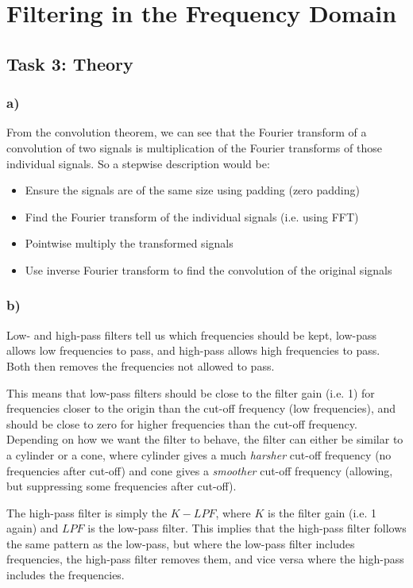 \section{Filtering in the Frequency Domain}
\subsection{Task 3: Theory}
\subsubsection*{a)}
From the convolution theorem, we can see that the Fourier transform of a convolution of two signals is multiplication of the Fourier transforms of those individual signals. So a stepwise description would be: 
\begin{itemize}
    \item Ensure the signals are of the same size using padding (zero padding)
    \item Find the Fourier transform of the individual signals (i.e. using FFT)
    \item Pointwise multiply the transformed signals
    \item Use inverse Fourier transform to find the convolution of the original signals
\end{itemize}

\subsubsection*{b)}
Low- and high-pass filters tell us which frequencies should be kept, low-pass allows low frequencies to pass, and high-pass allows high frequencies to pass. Both then removes the frequencies not allowed to pass. 

This means that low-pass filters should be close to the filter gain (i.e. 1) for frequencies closer to the origin than the cut-off frequency (low frequencies), and should be close to zero for higher frequencies than the cut-off frequency. Depending on how we want the filter to behave, the filter can either be similar to a cylinder or a cone, where cylinder gives a much \textit{harsher} cut-off frequency (no frequencies after cut-off) and cone gives a \textit{smoother} cut-off frequency (allowing, but suppressing some frequencies after cut-off). 

The high-pass filter is simply the $K - LPF$, where $K$ is the filter gain (i.e. 1 again) and $LPF$ is the low-pass filter. This implies that the high-pass filter follows the same pattern as the low-pass, but where the low-pass filter includes frequencies, the high-pass filter removes them, and vice versa where the high-pass includes the frequencies. 

